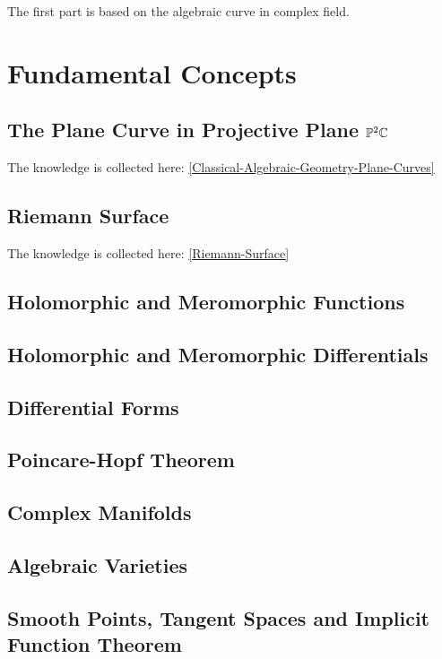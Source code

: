 \documentclass[Total.tex]{subfiles}
\begin{document}
	The first part is based on the algebraic curve in complex field.
	
	\chapter{Fundamental Concepts}
		\section{The Plane Curve in Projective Plane $\mathbb{P}^2\mathbb{C}$}
			
			The knowledge is collected here: \ref{Classical-Algebraic-Geometry-Plane-Curves}
			
		\section{Riemann Surface}
		
			The knowledge is collected here: \ref{Riemann-Surface}
			
		\section{Holomorphic and Meromorphic Functions}
		
		\section{Holomorphic and Meromorphic Differentials}
		
		\section{Differential Forms}
		
		\section{Poincare-Hopf Theorem}
		
		\section{Complex Manifolds}
		
		\section{Algebraic Varieties}
		
		\section{Smooth Points, Tangent Spaces and Implicit Function Theorem}
\end{document}
